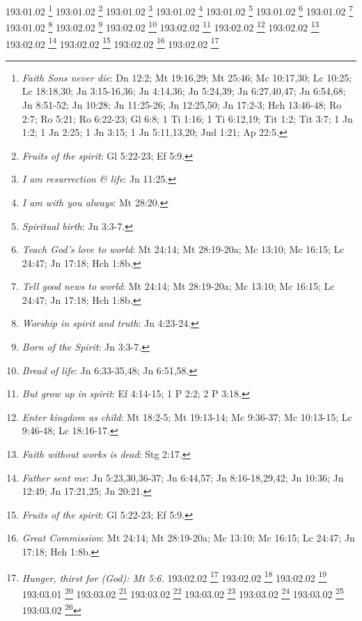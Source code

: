 {{{{{{{{{{{{{{{{{{{{{{{{{{{{{{{{{{{{{{{{{{{{{{{{{{{{{{{{{{{{{{{{{{{{{{{{{{{{{{{{{{{{{{{{{{{{{{193:01.02 \footnote{\textit{Faith Sons never die}: Dn 12:2; Mt 19:16,29; Mt 25:46; Mc 10:17,30; Lc 10:25; Lc 18:18,30; Jn 3:15-16,36; Jn 4:14,36; Jn 5:24,39; Jn 6:27,40,47; Jn 6:54,68; Jn 8:51-52; Jn 10:28; Jn 11:25-26; Jn 12:25,50; Jn 17:2-3; Hch 13:46-48; Ro 2:7; Ro 5:21; Ro 6:22-23; Gl 6:8; 1 Ti 1:16; 1 Ti 6:12,19; Tit 1:2; Tit 3:7; 1 Jn 1:2; 1 Jn 2:25; 1 Jn 3:15; 1 Jn 5:11,13,20; Jud 1:21; Ap 22:5.}
193:01.02 \footnote{\textit{Fruits of the spirit}: Gl 5:22-23; Ef 5:9.}
193:01.02 \footnote{\textit{I am resurrection & life}: Jn 11:25.}
193:01.02 \footnote{\textit{I am with you always}: Mt 28:20.}
193:01.02 \footnote{\textit{Spiritual birth}: Jn 3:3-7.}
193:01.02 \footnote{\textit{Teach God's love to world}: Mt 24:14; Mt 28:19-20a; Mc 13:10; Mc 16:15; Lc 24:47; Jn 17:18; Hch 1:8b.}
193:01.02 \footnote{\textit{Tell good news to world}: Mt 24:14; Mt 28:19-20a; Mc 13:10; Mc 16:15; Lc 24:47; Jn 17:18; Hch 1:8b.}
193:01.02 \footnote{\textit{Worship in spirit and truth}: Jn 4:23-24.}
193:02.02 \footnote{\textit{Born of the Spirit}: Jn 3:3-7.}
193:02.02 \footnote{\textit{Bread of life}: Jn 6:33-35,48; Jn 6:51,58.}
193:02.02 \footnote{\textit{But grow up in spirit}: Ef 4:14-15; 1 P 2:2; 2 P 3:18.}
193:02.02 \footnote{\textit{Enter kingdom as child}: Mt 18:2-5; Mt 19:13-14; Mc 9:36-37; Mc 10:13-15; Lc 9:46-48; Lc 18:16-17.}
193:02.02 \footnote{\textit{Faith without works is dead}: Stg 2:17.}
193:02.02 \footnote{\textit{Father sent me}: Jn 5:23,30,36-37; Jn 6:44,57; Jn 8:16-18,29,42; Jn 10:36; Jn 12:49; Jn 17:21,25; Jn 20:21.}
193:02.02 \footnote{\textit{Fruits of the spirit}: Gl 5:22-23; Ef 5:9.}
193:02.02 \footnote{\textit{Great Commission}: Mt 24:14; Mt 28:19-20a; Mc 13:10; Mc 16:15; Lc 24:47; Jn 17:18; Hch 1:8b.}
193:02.02 \footnote{\textit{Hunger, thirst for (God): Mt 5:6.}
193:02.02 \footnote{\textit{My peace I leave}: Jn 14:27.}
193:02.02 \footnote{\textit{Required to bear good fruit}: Mt 3:10; Mt 7:16-20; Mt 12:33; Lc 3:9; Lc 6:43-44; Lc 13:6-9; Jn 15:7-8,16.}
193:02.02 \footnote{\textit{Water of life}: Jn 7:38.}
193:03.01 \footnote{\textit{Jesus' final appearance}: Hch 1:4,6.}
193:03.02 \footnote{\textit{As God sent me, I send you}: Jn 17:18; Jn 20:21.}
193:03.02 \footnote{\textit{I go to the Father}: Jn 7:33-34; Jn 14:12b-28; Jn 16:5,10,16,28; Jn 20:17.}
193:03.02 \footnote{\textit{If have friends, be friendly}: Pr 18:24.}
193:03.02 \footnote{\textit{Love one another}: Ro 13:8-10; 1 Ts 4:9; 1 P 1:22; 1 Jn 3:11,23; 1 Jn 4:7,11-12; 2 Jn 1:5.}
193:03.02 \footnote{\textit{Love one another as Jesus did}: Jn 13:34-35; Jn 15:12,17.}
193:03.02 \footnote{\textit{Mistaken idea of Spirit of Truth}: Hch 1:6-8.}
}}}}}}}}}}}}}}}}}}}}}}}}}}}}}}}}}}}}}}}}}}}}}}}}}}}}}}}}}}}}}}}}}}}}}}}}}}}}}}}}}}}}}}}}}}}}}}}
